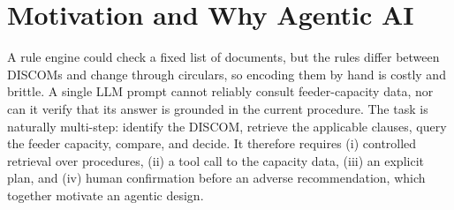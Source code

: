 \documentclass[12pt,a4paper,oneside]{report}
\newif\ifguidance
\newcommand{\guide}[1]{%
  \ifguidance
  \begin{tcolorbox}[enhanced,breakable,colback=guidebg,colframe=bmsblue,
    boxrule=0.6pt,arc=2pt,left=6pt,right=6pt,top=4pt,bottom=4pt,
    fonttitle=\bfseries\small,title={What to write here},
    before upper={\small\setstretch{1.1}}]
  #1
  \end{tcolorbox}
  \fi}
\newcommand{\dodont}[2]{%
  \ifguidance
  \begin{tcolorbox}[enhanced,breakable,sidebyside,sidebyside align=top seam,
    colback=dobg,colbacklower=dontbg,colframe=gray!60,boxrule=0.5pt,arc=2pt,
    lefthand ratio=0.5,left=5pt,right=5pt,top=4pt,bottom=4pt,
    fontupper=\small\setstretch{1.05},fontlower=\small\setstretch{1.05}]
  \textbf{\textcolor{ForestGreen}{\checkmark\ Do}}
  \begin{itemize}[leftmargin=12pt,itemsep=1pt,topsep=2pt]#1\end{itemize}
  \tcblower
  \textbf{\textcolor{BrickRed}{$\times$ Don't}}
  \begin{itemize}[leftmargin=12pt,itemsep=1pt,topsep=2pt]#2\end{itemize}
  \end{tcolorbox}
  \fi}
\newenvironment{sample}
  {\par\noindent{\footnotesize\bfseries\textcolor{BrickRed}{[SAMPLE --- replace with your own content]}}\par\color{samplecol}}
  {\par\medskip}
\begin{document}
\section{Motivation and Why Agentic AI}
\guide{Explain why a plain script, a rule engine, or a single LLM prompt is insufficient, and which
agentic capabilities (tool use, retrieval, planning, reflection, human-in-the-loop) the problem
genuinely requires. This section is assessed directly in the viva.}
\dodont{\item Compare explicitly with simpler alternatives.
\item Link each agentic capability to a concrete property of the problem.}
{\item Do not claim an agent is needed merely because it is ``more intelligent''.
\item Do not list agentic features that your system does not use.}
\begin{sample}
A rule engine could check a fixed list of documents, but the rules differ between DISCOMs and change
through circulars, so encoding them by hand is costly and brittle. A single LLM prompt cannot
reliably consult feeder-capacity data, nor can it verify that its answer is grounded in the current
procedure. The task is naturally multi-step: identify the DISCOM, retrieve the applicable clauses,
query the feeder capacity, compare, and decide. It therefore requires (i) controlled retrieval over
procedures, (ii) a tool call to the capacity data, (iii) an explicit plan, and (iv) human confirmation
before an adverse recommendation, which together motivate an agentic design.
\end{sample}
\end{document}
